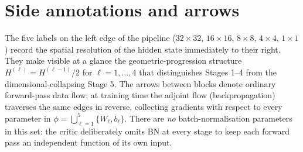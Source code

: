 \section*{Side annotations and arrows}

The five labels on the left edge of the pipeline ($32 \times 32,\,
16 \times 16,\, 8 \times 8,\, 4 \times 4,\, 1 \times 1$) record the
spatial resolution of the hidden state immediately to their right. They
make visible at a glance the geometric-progression structure
$H^{(\ell)} = H^{(\ell - 1)} / 2$ for $\ell = 1, \ldots, 4$ that
distinguishes Stages 1--4 from the dimensional-collapsing Stage 5. The
arrows between blocks denote ordinary forward-pass data flow; at
training time the adjoint flow (backpropagation) traverses the same
edges in reverse, collecting gradients with respect to every parameter
in $\phi = \bigcup_{\ell=1}^{5}\{W_\ell, b_\ell\}$. There are
\emph{no} batch-normalisation parameters in this set: the critic
deliberately omits BN at every stage to keep each forward pass an
independent function of its own input.
